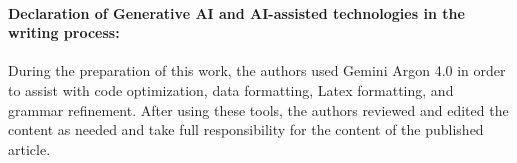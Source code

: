 \documentclass[11pt,a4paper]{article}
\theoremstyle{definition}
\theoremstyle{remark}
\begin{document}
\paragraph{Declaration of Generative AI and AI-assisted technologies in the writing process:} During the preparation of this work, the authors used Gemini Argon 4.0 in order to assist with code optimization, data formatting, Latex formatting, and grammar refinement. After using these tools, the authors reviewed and edited the content as needed and take full responsibility for the content of the published article.


\begingroup
\raggedright

\endgroup
\end{document}
